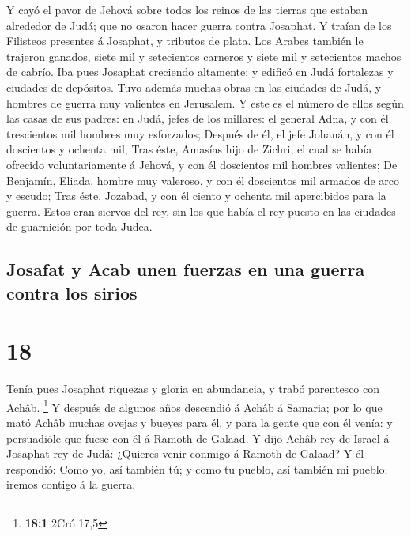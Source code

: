  Y cayó el pavor de Jehová sobre todos los reinos de las
tierras que estaban alrededor de Judá; que no osaron hacer guerra contra
Josaphat.  Y traían de los Filisteos presentes á Josaphat,
y tributos de plata. Los Arabes también le trajeron ganados, siete mil y
setecientos carneros y siete mil y setecientos machos de cabrío.
 Iba pues Josaphat creciendo altamente: y edificó en Judá
fortalezas y ciudades de depósitos.  Tuvo además muchas
obras en las ciudades de Judá, y hombres de guerra muy valientes en
Jerusalem.  Y este es el número de ellos según las casas de
sus padres: en Judá, jefes de los millares: el general Adna, y con él
trescientos mil hombres muy esforzados;  Después de él, el
jefe Johanán, y con él doscientos y ochenta mil;  Tras
éste, Amasías hijo de Zichri, el cual se había ofrecido voluntariamente
á Jehová, y con él doscientos mil hombres valientes;  De
Benjamín, Eliada, hombre muy valeroso, y con él doscientos mil armados
de arco y escudo;  Tras éste, Jozabad, y con él ciento y
ochenta mil apercibidos para la guerra.  Estos eran siervos
del rey, sin los que había el rey puesto en las ciudades de guarnición
por toda Judea.

\hypertarget{josafat-y-acab-unen-fuerzas-en-una-guerra-contra-los-sirios}{%
\subsection{Josafat y Acab unen fuerzas en una guerra contra los
sirios}\label{josafat-y-acab-unen-fuerzas-en-una-guerra-contra-los-sirios}}

\hypertarget{section-17}{%
\section{18}\label{section-17}}

 Tenía pues Josaphat riquezas y gloria en abundancia, y
trabó parentesco con Achâb. \footnote{\textbf{18:1} 2Cró 17,5}
 Y después de algunos años descendió á Achâb á Samaria; por
lo que mató Achâb muchas ovejas y bueyes para él, y para la gente que
con él venía: y persuadióle que fuese con él á Ramoth de Galaad.
 Y dijo Achâb rey de Israel á Josaphat rey de Judá: ¿Quieres
venir conmigo á Ramoth de Galaad? Y él respondió: Como yo, así también
tú; y como tu pueblo, así también mi pueblo: iremos contigo á la guerra.

